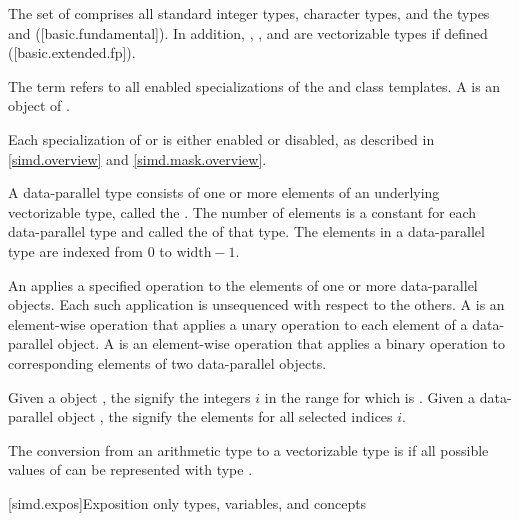 \pnum\label{wording.vectorizable.types}%
The set of  comprises all standard integer types,
character types, and the types  and 
([basic.fundamental]).
In addition, , , and
 are vectorizable types if defined ([basic.extended.fp]).

\pnum
The term  refers to all enabled specializations of
the  and  class templates. A  is
an object of .

\pnum
Each specialization of  or  is either enabled or disabled,
as described in \ref{simd.overview} and \ref{simd.mask.overview}.

\pnum
A data-parallel type consists of one or more elements of an underlying vectorizable type,
called the .
The number of elements is a constant for each data-parallel type and called the
 of that type.
The elements in a data-parallel type are indexed from 0 to $\textrm{width} - 1$.

\pnum
An  applies a specified operation to the elements of one or more
data-parallel objects. Each such application is unsequenced with respect to the others. A
 is an element-wise operation that applies a unary operation to
each element of a data-parallel object. A  is an element-wise
operation that applies a binary operation to corresponding elements of two data-parallel objects.

\pnum\label{wording.selected.indices}%
Given a  object , the
 signify the integers $i$ in the range
 for which  is .
Given a data-parallel object , the  signify the elements
 for all selected indices $i$.

\pnum
The conversion from an arithmetic type  to a vectorizable type  is
 if
all possible values of  can be represented with type .

[simd.expos]{Exposition only types, variables, and concepts}

